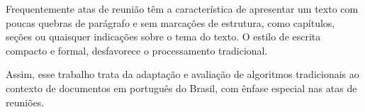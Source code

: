 Frequentemente atas de reunião têm a característica de apresentar um texto com poucas quebras de parágrafo e sem marcações de estrutura, como capítulos, seções ou quaisquer indicações sobre o tema do texto. O estilo de escrita compacto e formal, desfavorece o processamento tradicional.

Assim, esse trabalho trata da adaptação e avaliação de algoritmos tradicionais ao contexto de documentos em português do Brasil, com ênfase especial nas atas de reuniões.































